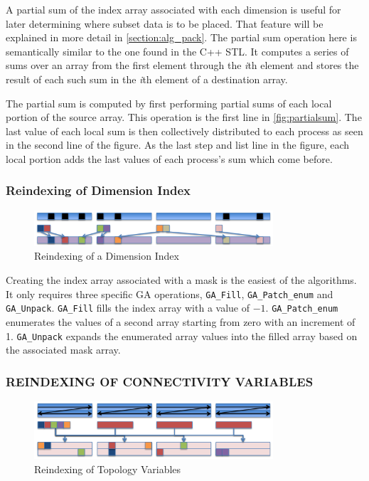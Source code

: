 A partial sum of the index array associated with each dimension is useful for
later determining where subset data is to be placed.  That feature will be
explained in more detail in \ref{section:alg_pack}.  The partial sum operation
here is semantically similar to the one found in the C++ STL\cite{CXXSTL}.  It
computes a series of sums over an array from the first element through the
\emph{i}th element and stores the result of each such sum in the \emph{i}th
element of a destination array.

The partial sum is computed by first performing partial sums of each local
portion of the source array.  This operation is the first line in
\ref{fig:partialsum}.  The last value of each local sum is then collectively
distributed to each process as seen in the second line of the figure.  As the
last step and list line in the figure, each local portion adds the last values
of each process's sum which come before.

\subsubsection{Reindexing of Dimension Index}

\begin{figure}[!t]
\center
\includegraphics[width=3.5in]{images/unpack}
\caption{Reindexing of a Dimension Index}
\label{fig:unpack}
\end{figure}

Creating the index array associated with a mask is the easiest of the
algorithms.  It only requires three specific GA operations, \verb=GA_Fill=,
\verb=GA_Patch_enum= and \verb=GA_Unpack=.  \verb=GA_Fill= fills the index
array with a value of $-1$.  \verb=GA_Patch_enum= enumerates the values of a
second array starting from zero with an increment of 1.  \verb=GA_Unpack=
expands the enumerated array values into the filled array based on the
associated mask array.

\subsubsection{REINDEXING OF CONNECTIVITY VARIABLES}

\begin{figure}[!t]
\center
\includegraphics[width=3.5in]{images/reindex}
\caption{Reindexing of Topology Variables}
\label{fig:reindex}
\end{figure}

